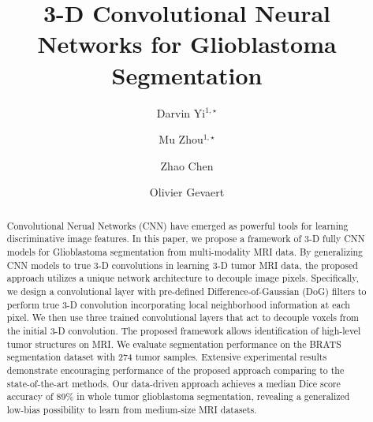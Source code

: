 \documentclass{llncs}
\begin{document}
\newcommand\blfootnote[1]{%
  \begingroup
  \renewcommand\thefootnote{}\footnote{#1}%
  \addtocounter{footnote}{-1}%
  \endgroup
}


\mainmatter              %
%
\title{3-D Convolutional Neural Networks for Glioblastoma Segmentation}
%
%
\author{Darvin Yi$^{1,\star}$ \and Mu Zhou$^{1,\star}$ \and Zhao Chen \and Olivier Gevaert}
%
%
%

\maketitle              %

\begin{abstract}
Convolutional Nerual Networks (CNN) have emerged as powerful tools for learning discriminative image features. In this paper, we propose a framework of 3-D fully CNN models for Glioblastoma segmentation from multi-modality MRI data. By generalizing CNN models to true 3-D convolutions in learning 3-D tumor MRI data, the proposed approach utilizes a unique network architecture to decouple image pixels. Specifically, we design a convolutional layer with pre-defined Difference-of-Gaussian (DoG) filters to perform true 3-D convolution incorporating local neighborhood information at each pixel. We then use three trained convolutional layers that act to decouple voxels from the initial 3-D convolution. The proposed framework allows identification of high-level tumor structures on MRI. We evaluate segmentation performance on the BRATS segmentation dataset with 274 tumor samples. Extensive experimental results demonstrate encouraging performance of the proposed approach comparing to the state-of-the-art methods. Our data-driven approach achieves a median Dice score accuracy of 89\% in whole tumor glioblastoma segmentation, revealing a generalized low-bias possibility to learn from medium-size MRI datasets.

\end{abstract}
\end{document}
